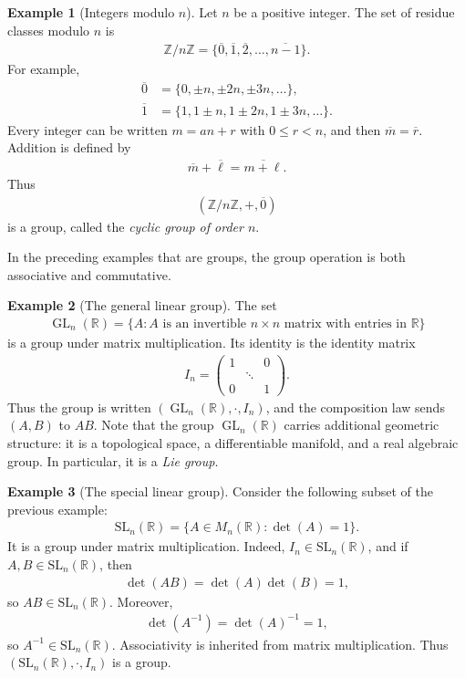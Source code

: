 \documentclass[reqno,11pt]{amsart}
\theoremstyle{definition}
\newtheorem{definition}{Definition}[section]
\newtheorem{example}{Example}[section]
\theoremstyle{plain}
\theoremstyle{remark}
\numberwithin{equation}{section}
\newcommand{\Z}{\mathbb{Z}}
\newcommand{\R}{\mathbb{R}}
\newcommand{\GL}{\operatorname{GL}}
\newcommand{\be}{\begin{eqnarray}}
\newcommand{\ee}{\end{eqnarray}}
\begin{document}
\begin{example}[Integers modulo $n$]
Let $n$ be a positive integer. The set of residue classes modulo $n$ is
\be
\Z/n\Z=\{\overline{0},\overline{1},\overline{2},\ldots,
  \overline{n-1}\}.
\ee
For example,
\begin{align*}
  \overline{0}&=\{0,\pm n,\pm 2n,\pm 3n,\ldots\},\\
  \overline{1}&=\{1,1\pm n,1\pm 2n,1\pm 3n,\ldots\}.
\end{align*}
Every integer can be written $m=an+r$ with $0\le r<n$, and then
$\overline{m}=\overline{r}$. Addition is defined by
\be
\overline{m}+\overline{\ell}=\overline{m+\ell}.
\ee
Thus
\be
(\Z/n\Z,+,\overline{0})
\ee
is a group, called the \emph{cyclic group of order $n$}.
\end{example}
%

In the preceding examples that are groups, the group operation is both
associative and commutative.


\begin{example}[The general linear group]
The set
\be
\GL_n(\R)=\{A:A\text{ is an invertible }n\times n
  \text{ matrix with entries in }\R\}
\ee
is a group under matrix multiplication. Its identity is the identity matrix
\be
I_n=
  \begin{pmatrix}
	    1 &        & 0\\
	      & \ddots &  \\
	    0 &        & 1
	  \end{pmatrix}.
\ee
Thus the group is written $(\GL_n(\R),\cdot,I_n)$, and the composition law
sends $(A,B)$ to $AB$. Note that the group $\GL_n(\R)$ carries additional
geometric structure: it is a topological space, a differentiable manifold,
and a real algebraic group. In particular, it is a \emph{Lie group}.
\end{example}

\newcommand{\SL}{\mathrm{SL}}

\begin{example}[The special linear group]
Consider the following subset of the previous example:
\be
\SL_n(\R)=\{A\in M_n(\R):\det(A)=1\}.
\ee
It is a group under matrix multiplication. Indeed, $I_n\in\SL_n(\R)$, and
if $A,B\in\SL_n(\R)$, then
\be
\det(AB)=\det(A)\det(B)=1,
\ee
so $AB\in\SL_n(\R)$. Moreover,
\be
\det(A^{-1})=\det(A)^{-1}=1,
\ee
so $A^{-1}\in\SL_n(\R)$. Associativity is inherited from matrix
multiplication. Thus $(\SL_n(\R),\cdot,I_n)$ is a group.
\end{example}
\end{document}
